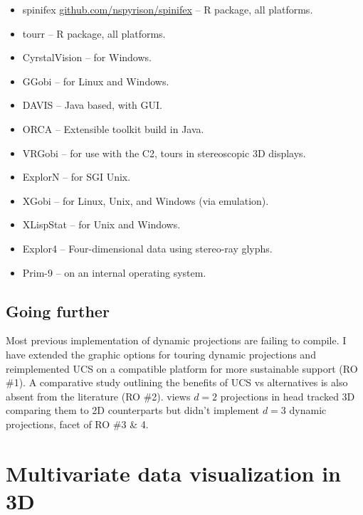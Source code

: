 \documentclass{monashthesis}
\begin{document}
\begin{itemize}
\tightlist
\item
  spinifex
  \href{https://github.com/nspyrison/spinifex}{github.com/nspyrison/spinifex}
  -- R package, all platforms.
\item
  tourr \autocite{wickham_tourr_2011} -- R package, all platforms.
\item
  CyrstalVision \autocite{wegman_visual_2003} -- for Windows.
\item
  GGobi \autocite{swayne_ggobi:_2003} -- for Linux and Windows.
\item
  DAVIS \autocite{huh_davis:_2002} -- Java based, with GUI.
\item
  ORCA \autocite{sutherland_orca:_2000} -- Extensible toolkit build in
  Java.
\item
  VRGobi \autocite{nelson_xgobi_1998} -- for use with the C2, tours in
  stereoscopic 3D displays.
\item
  ExplorN \autocite{carr_explorn:_1996} -- for SGI Unix.
\item
  XGobi \autocite{swayne_xgobi:_1991} -- for Linux, Unix, and Windows
  (via emulation).
\item
  XLispStat \autocite{tierney_lisp-stat:_1990} -- for Unix and Windows.
\item
  Explor4 \autocite{carr_explor4:_1988} -- Four-dimensional data using
  stereo-ray glyphs.
\item
  Prim-9 \autocites{asimov_grand_1985}{fisherkeller_prim-9:_1974} -- on
  an internal operating system.
\end{itemize}

\subsection{Going further}\label{going-further}

Most previous implementation of dynamic projections are failing to
compile. I have extended the graphic options for touring dynamic
projections and reimplemented UCS on a compatible platform for more
sustainable support (RO \#1). A comparative study outlining the benefits
of UCS vs alternatives is also absent from the literature (RO \#2).
\textcite{nelson_xgobi_1998} views \(d=2\) projections in head tracked
3D comparing them to 2D counterparts but didn't implement \(d=3\)
dynamic projections, facet of RO \#3 \& 4.

\section{Multivariate data visualization in 3D}\label{sec:3d}
\end{document}
